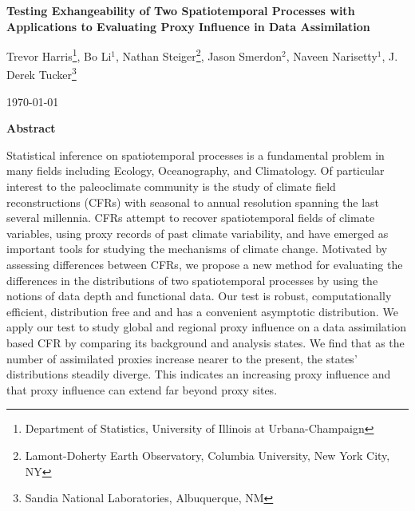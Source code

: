 \documentclass[12pt]{article}
\begin{document}
\thispagestyle{empty}
\baselineskip=28pt \vskip 5mm
\begin{center} {\LARGE{\bf  Testing Exhangeability of Two Spatiotemporal Processes with Applications to Evaluating Proxy Influence in Data Assimilation}}
\end{center}

\baselineskip=14pt \vskip 10mm

\begin{center}\large
Trevor Harris\footnote{\baselineskip=12pt Department of Statistics, University of Illinois at Urbana-Champaign},
        Bo Li$^1$,
        Nathan Steiger\footnote{\baselineskip=12pt Lamont-Doherty Earth Observatory, Columbia University, New York City, NY},
        Jason Smerdon$^2$,
        Naveen Narisetty$^1$,
        J. Derek Tucker\footnote{\baselineskip=12pt Sandia National Laboratories, Albuquerque, NM}
\end{center}
\baselineskip=19pt \vskip 15mm \centerline{\today} \vskip 6mm


\begin{center}
{\large{\bf Abstract}}
\end{center}

Statistical inference on spatiotemporal processes is a fundamental problem in many fields including Ecology, Oceanography, and Climatology. Of particular interest to the paleoclimate community is the study of climate field reconstructions (CFRs) with seasonal to annual resolution spanning the last several millennia. CFRs attempt to recover spatiotemporal fields of climate variables, using proxy records of past climate variability, and have emerged as important tools for studying the mechanisms of climate change. Motivated by assessing differences between CFRs, we propose a new method for evaluating the differences in the distributions of two spatiotemporal processes by using the notions of data depth and functional data. Our test is robust, computationally efficient, distribution free and and has a convenient asymptotic distribution. We apply our test to study global and regional proxy influence on a data assimilation based CFR by comparing its background and analysis states. We find that as the number of assimilated proxies increase nearer to the present, the states' distributions steadily diverge. This indicates an increasing proxy influence and that proxy influence can extend far beyond proxy sites.
\baselineskip=14pt
\end{document}

